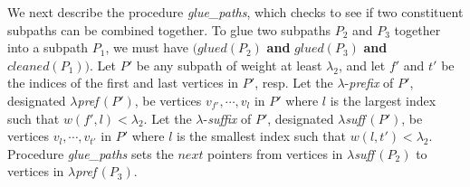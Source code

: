 {{\dspace
\bigskip

We next describe the procedure {\it glue\_paths},
which checks to see if two constituent subpaths can be combined together.
To glue two subpaths $P_2$ and $P_3$ together into a subpath $P_1$,
we must have $(glued(P_2)$ {\bf and} $glued(P_3)$ {\bf and} $cleaned(P_1))$.
Let $P'$ be any subpath of weight at least $\lambda_2$,
and let $f'$ and $t'$ be the indices of the first and last vertices in $P'$,
resp.
Let the $\lambda$-{\it prefix} of $P'$, designated $\lambda${\it pref}$\,(P')$,
be vertices $v_{f'},\cdots ,v_l$ in $P'$ where $l$ is the largest index
such that $w(f',l) < \lambda_2$.
Let the $\lambda$-{\it suffix} of $P'$, designated $\lambda${\it suff}$\,(P')$,
be vertices $v_l,\cdots ,v_{t'}$ in $P'$ where $l$ is the smallest index
such that $w(l,t') < \lambda_2$.
Procedure {\it glue\_paths} sets the $next$ pointers from
vertices in $\lambda${\it suff}$\,(P_2)$ to vertices
in $\lambda${\it pref}$\,(P_3)$. \\

}}
